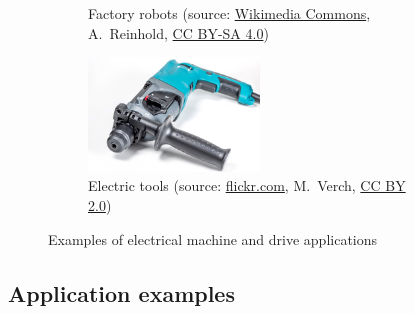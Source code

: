 \begin{frame}
\begin{figure}
\begin{subfigure}[b]{0.49\textwidth}
			\caption{Factory robots (source: \href{https://commons.wikimedia.org/wiki/File:Automatix_KukaRobot483.agr.jpg}{Wikimedia Commons}, A.~Reinhold, \href{https://creativecommons.org/licenses/by-sa/4.0/deed.en}{CC BY-SA 4.0})}
		\end{subfigure}
		\hfill
		\begin{subfigure}[b]{0.49\textwidth}
			\centering
			\includegraphics[width=0.5\textwidth]{fig/lec01/electric_drill.jpg}
			\caption{Electric tools (source: \href{https://www.flickr.com/photos/30478819@N08/49940384798}{flickr.com},  M.~Verch, \href{https://creativecommons.org/licenses/by/2.0/}{CC BY 2.0})}
		\end{subfigure}
		\caption*{Examples of electrical machine and drive applications} 
        \label{fig:examples_machine_drives_01}
	\end{figure}
\end{frame}

\subsection{Application examples}


